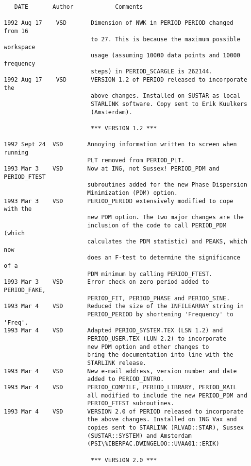\newpage


\begin{verbatim}
   DATE       Author            Comments                           
                           
1992 Aug 17    VSD       Dimension of NWK in PERIOD_PERIOD changed from 16
                         to 27. This is because the maximum possible workspace
                         usage (assuming 10000 data points and 10000 frequency
                         steps) in PERIOD_SCARGLE is 262144.
1992 Aug 17    VSD       VERSION 1.2 of PERIOD released to incorporate the
                         above changes. Installed on SUSTAR as local 
                         STARLINK software. Copy sent to Erik Kuulkers
                         (Amsterdam).
	                   
                         *** VERSION 1.2 *** 
	                   
1992 Sept 24  VSD       Annoying information written to screen when running
                        PLT removed from PERIOD_PLT.
1993 Mar 3    VSD       Now at ING, not Sussex! PERIOD_PDM and PERIOD_FTEST 
                        subroutines added for the new Phase Dispersion 
                        Minimization (PDM) option.
1993 Mar 3    VSD       PERIOD_PERIOD extensively modified to cope with the
                        new PDM option. The two major changes are the 
                        inclusion of the code to call PERIOD_PDM (which 
                        calculates the PDM statistic) and PEAKS, which now
                        does an F-test to determine the significance of a
                        PDM minimum by calling PERIOD_FTEST.
1993 Mar 3    VSD       Error check on zero period added to PERIOD_FAKE,
                        PERIOD_FIT, PERIOD_PHASE and PERIOD_SINE.
1993 Mar 4    VSD       Reduced the size of the INFILEARRAY string in 
                        PERIOD_PERIOD by shortening 'Frequency' to 'Freq'.
1993 Mar 4    VSD       Adapted PERIOD_SYSTEM.TEX (LSN 1.2) and 
                        PERIOD_USER.TEX (LUN 2.2) to incorporate 
                        new PDM option and other changes to 
                        bring the documentation into line with the 
                        STARLINK release.
1993 Mar 4    VSD       New e-mail address, version number and date
                        added to PERIOD_INTRO.
1993 Mar 4    VSD       PERIOD_COMPILE, PERIOD_LIBRARY, PERIOD_MAIL
                        all modified to include the new PERIOD_PDM and
                        PERIOD_FTEST subroutines. 
1993 Mar 4    VSD       VERSION 2.0 of PERIOD released to incorporate
                        the above changes. Installed on ING Vax and
                        copies sent to STARLINK (RLVAD::STAR), Sussex 
                        (SUSTAR::SYSTEM) and Amsterdam 
                        (PSI\%IBERPAC.DWINGELOO::UVAA01::ERIK) 
	                   
                         *** VERSION 2.0 *** 
	                   
\end{verbatim}


